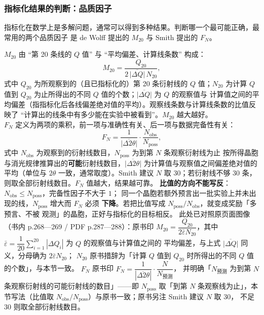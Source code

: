 \subsubsection{指标化结果的判断：品质因子}

指标化在数学上是多解问题，通常可以得到多种结果。判断哪一个最可能正确，最常用的两个品质因子
是 de Wolff 提出的 $M_{20}$ 与 Smith 提出的 $F_{N}$。

\begin{principle}
$M_{20}$ 由 “第 20 条线的 $Q$ 值” 与 “平均偏差、计算线条数” 构成：
\begin{equation}
M_{20}=\frac{Q_{20}}{2\,\overline{\left|\Delta Q\right|}\,N_{20}} ,
\label{eq:ch04b-M20}
\end{equation}
式中 $Q_{20}$ 为所观察到的（且已指标化的）第 20 条衍射线的 $Q$ 值；$N_{20}$ 为计算 $Q$ 值到
$Q_{20}$ 为止所得出的不同 $Q$ 值的个数；$\overline{\left|\Delta Q\right|}$ 为 $Q$ 的观察值与
计算值之间的平均偏差（指指标化后各线偏差绝对值的平均）。观察线条数与计算线条数的比值反映了
“计算出的线条中有多少能在实验中被看到”。$M_{20}$ 越大越好。\\
$F_{N}$ 定义为两项的乘积，前一项与准确性有关、后一项与数据完备性有关：
\begin{equation}
F_{N}=\frac{1}{\overline{\left|\Delta2\theta\right|}}\cdot\frac{N_{\mathrm{obs}}}{N_{\mathrm{poss}}} ,
\label{eq:ch04b-FN}
\end{equation}
式中 $N_{\mathrm{obs}}$ 为观察到的衍射线数目，$N_{\mathrm{poss}}$ 为到第 $N$ 条观察衍射线为止
按所得晶胞与消光规律推算出的\textbf{可能}衍射线数目，$\overline{\left|\Delta2\theta\right|}$
为计算值与观察值之间偏差绝对值的平均（单位与 $2\theta$ 一致，通常取度）。Smith 建议 $N$ 取
$30$；若衍射线不够 $30$ 条，则取全部衍射线数目。$F_{N}$ 值越大，结果越可靠。
\textbf{比值的方向不能写反}：$N_{\mathrm{obs}}\le N_{\mathrm{poss}}$，完备性因子不大于 $1$；
同一个晶胞若额外预言出一批实验上并未出现的线，$N_{\mathrm{poss}}$ 增大而 $F_{N}$ 必须
\textbf{下降}。若把比值写成 $N_{\mathrm{poss}}/N_{\mathrm{obs}}$，就变成奖励「多预言、不被
观测」的晶胞，正好与指标化的目标相反。
此处已对照原页面图像（书内 p.268—269 / PDF p.287—288）：原书印
$M_{20}=\dfrac{Q_{20}}{2\bar{\varepsilon}N_{20}}$，其中
$\bar{\varepsilon}=\dfrac{1}{20}\sum_{i=1}^{20}|\Delta Q_{i}|$ 为 $Q$ 的观察值与计算值之间的
平均偏差，与上式 $\overline{|\Delta Q|}$ 同义，分母确为 $2\bar{\varepsilon}N_{20}$；
$N_{20}$ 原书措辞为「计算 $Q$ 值到 $Q_{20}$ 时所得出的不同 $Q$ 值的个数」，与本节一致。
$F_{N}$ 原书印 $F_{N}=\dfrac{1}{|\overline{\Delta2\theta}|}\cdot\dfrac{N}{N_{\text{预测}}}$，
并明确「$N_{\text{预测}}$ 为到第 $N$ 条观察衍射线的可能衍射线的数目」——即
$N_{\mathrm{poss}}$ 取「到第 $N$ 条观察线为止」，本节写法（比值取
$N_{\mathrm{obs}}/N_{\mathrm{poss}}$）与原书一致；原书另注 Smith 建议 $N$ 取 $30$，
不足 $30$ 则取全部衍射线数目。
\end{principle}

